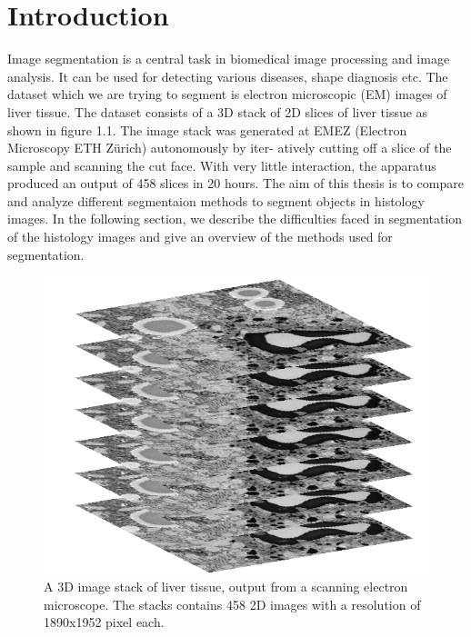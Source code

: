 %


\chapter{Introduction}
Image segmentation is a central task in biomedical image processing and image analysis. It can be used for detecting various diseases, shape diagnosis etc. The dataset which we are trying to segment is electron microscopic (EM) images of liver tissue. The dataset consists of a 3D stack of 2D slices of liver tissue as shown in figure 1.1. The image stack was generated at EMEZ (Electron Microscopy ETH Zürich) autonomously by iter-
atively cutting off a slice of the sample and scanning the cut face. With very little
interaction, the apparatus produced an output of 458 slices in 20 hours. The aim of this thesis is to compare and analyze different segmentaion methods to segment objects in histology images. In the following section, we describe the difficulties faced in segmentation of the histology images and give an overview of the methods used for segmentation. 

\begin{figure}[h!] \label{fig:3dstack}
\centering
 \includegraphics[width=0.8\linewidth]{figures/3d_stack.png}
\caption{A 3D image stack of liver tissue, output from a scanning electron microscope.
The stacks contains 458 2D images with a resolution of 1890x1952 pixel each.}
\end{figure}



